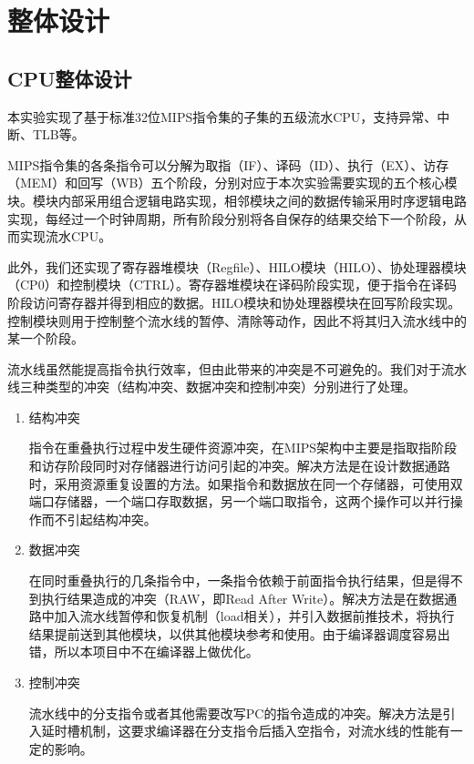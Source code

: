 \section{整体设计}
\subsection{CPU整体设计}
本实验实现了基于标准32位MIPS指令集的子集的五级流水CPU，支持异常、中断、TLB等。

MIPS指令集的各条指令可以分解为取指（IF）、译码（ID）、执行（EX）、访存（MEM）和回写（WB）五个阶段，分别对应于本次实验需要实现的五个核心模块。模块内部采用组合逻辑电路实现，相邻模块之间的数据传输采用时序逻辑电路实现，每经过一个时钟周期，所有阶段分别将各自保存的结果交给下一个阶段，从而实现流水CPU。

此外，我们还实现了寄存器堆模块（Regfile）、HILO模块（HILO）、协处理器模块（CP0）和控制模块（CTRL）。寄存器堆模块在译码阶段实现，便于指令在译码阶段访问寄存器并得到相应的数据。HILO模块和协处理器模块在回写阶段实现。控制模块则用于控制整个流水线的暂停、清除等动作，因此不将其归入流水线中的某一个阶段。

流水线虽然能提高指令执行效率，但由此带来的冲突是不可避免的。我们对于流水线三种类型的冲突（结构冲突、数据冲突和控制冲突）分别进行了处理。

\begin{enumerate}
	\item 结构冲突
	
	指令在重叠执行过程中发生硬件资源冲突，在MIPS架构中主要是指取指阶段和访存阶段同时对存储器进行访问引起的冲突。解决方法是在设计数据通路时，采用资源重复设置的方法。如果指令和数据放在同一个存储器，可使用双端口存储器，一个端口存取数据，另一个端口取指令，这两个操作可以并行操作而不引起结构冲突。
	
	\item 数据冲突
	
	在同时重叠执行的几条指令中，一条指令依赖于前面指令执行结果，但是得不到执行结果造成的冲突（RAW，即Read After Write）。解决方法是在数据通路中加入流水线暂停和恢复机制（load相关），并引入数据前推技术，将执行结果提前送到其他模块，以供其他模块参考和使用。由于编译器调度容易出错，所以本项目中不在编译器上做优化。
	
	\item 控制冲突
	
	流水线中的分支指令或者其他需要改写PC的指令造成的冲突。解决方法是引入延时槽机制，这要求编译器在分支指令后插入空指令，对流水线的性能有一定的影响。
	
\end{enumerate}

